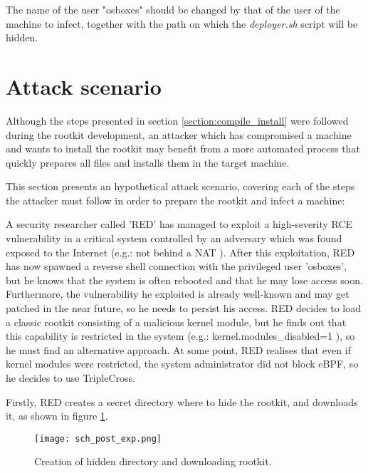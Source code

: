 The name of the user "osboxes" should be changed by that of the user of the machine to infect, together with the path on which the \textit{deployer.sh} script will be hidden.

\section{Attack scenario} \label{section:attack_scenario}
Although the steps presented in section \ref{section:compile_install} were followed during the rootkit development, an attacker which has compromised a machine and wants to install the rootkit may benefit from a more automated process that quickly prepares all files and installs them in the target machine.

This section presents an hypothetical attack scenario, covering each of the steps the attacker must follow in order to prepare the rootkit and infect a machine:

A security researcher called 'RED' has managed to exploit a high-severity RCE vulnerability in a critical system controlled by an adversary which was found exposed to the Internet (e.g.: not behind a NAT \cite{nat_comptia}). After this exploitation, RED has now spawned a reverse shell connection with the privileged user 'osboxes', but he knows that the system is often rebooted and that he may lose access soon. Furthermore, the vulnerability he exploited is already well-known and may get patched in the near future, so he needs to persist his access. RED decides to load a classic rootkit consisting of a malicious kernel module, but he finds out that this capability is restricted in the system (e.g.: kernel.modules\_disabled=1 \cite{kernel_modules_restrict}), so he must find an alternative approach. At some point, RED realises that even if kernel modules were restricted, the system administrator did not block eBPF, so he decides to use TripleCross.

Firstly, RED creates a secret directory where to hide the rootkit, and downloads it, as shown in figure \ref{fig:post_exp}.

\begin{figure}[htbp]
	\centering
	\texttt{[image: sch\_post\_exp.png]}
	\caption{Creation of hidden directory and downloading rootkit.}
	\label{fig:post_exp}
\end{figure}

